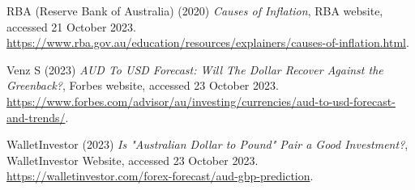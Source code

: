 \documentclass{article}
\begin{document}
\vspace{1em}

\noindent
RBA (Reserve Bank of Australia) (2020) \emph{Causes of Inflation}, RBA website, accessed 21 October 2023. \href{https://www.rba.gov.au/education/resources/explainers/causes-of-inflation.html}{https://www.rba.gov.au/education/resources/explainers/causes-of-inflation.html}.

\vspace{1em}

\noindent
Venz S (2023) \emph{AUD To USD Forecast: Will The Dollar Recover Against the Greenback?}, Forbes website, accessed 23 October 2023. \href{https://www.forbes.com/advisor/au/investing/currencies/aud-to-usd-forecast-and-trends/}{https://www.forbes.com/advisor/au/investing/currencies/aud-to-usd-forecast-and-trends/}.

\vspace{1em}

\noindent
WalletInvestor (2023) \emph{Is "Australian Dollar to Pound" Pair a Good Investment?}, WalletInvestor Website, accessed 23 October 2023. \href{https://walletinvestor.com/forex-forecast/aud-gbp-prediction#google_vignette}{https://walletinvestor.com/forex-forecast/aud-gbp-prediction}.
\end{document}
